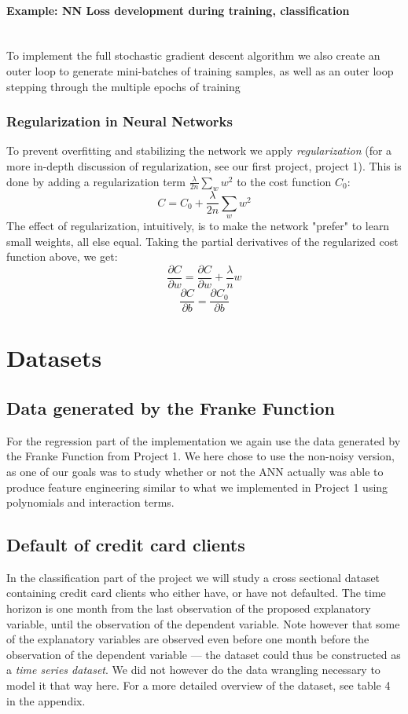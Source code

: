 \documentclass[10pt, a4paper, twocolumn]{article}
\newcommand{\myparagraph}[1]{\paragraph{#1}\mbox{}\\}
\begin{document}
			\myparagraph{Example: NN Loss development during training, classification}
			To implement the full stochastic gradient descent algorithm we also create an outer loop to generate mini-batches of training samples, as well as an outer loop stepping through the multiple epochs of training
		\subsubsection{Regularization in Neural Networks}
			To prevent overfitting and stabilizing the network we apply \emph{regularization} (for a more in-depth discussion of regularization, see our first project, project 1\cite{Project1}). This is done by adding a regularization term $\frac{\lambda}{2n}\sum_w w^2$ to the cost function $C_0$:
				\begin{equation} 
					C = C_0 + \frac{\lambda}{2n} \sum_w w^2 \tag{Regularized cost function}
				\end{equation}
			The effect of regularization, intuitively, is to make the network "prefer" to learn small weights, all else equal. Taking the partial derivatives of the regularized cost function above, we get:
			$$\frac{\partial C}{\partial w}=\frac{\partial C}{\partial w}+\frac{\lambda}{n}w$$
			$$\frac{\partial C}{\partial b}=\frac{\partial C_0}{\partial b}$$
\section{Datasets}
	\subsection{Data generated by the Franke Function}
		For the regression part of the implementation we again use the data generated by the Franke Function from Project 1\cite{Project1}. We here chose to use the non-noisy version, as one of our goals was to study whether or not the ANN actually was able to produce feature engineering similar to what we implemented in Project 1 using polynomials and interaction terms.
	\subsection{Default of credit card clients}
		In the classification part of the project we will study a cross sectional dataset containing credit card clients who either have, or have not defaulted. The time horizon is one month from the last observation of the proposed explanatory variable, until the observation of the dependent variable. Note however that some of the explanatory variables are observed even before one month before the observation of the dependent variable --- the dataset could thus be constructed as a \emph{time series dataset}. We did not however do the data wrangling necessary to model it that way here. For a more detailed overview of the dataset, see table 4 in the appendix.
\end{document}
